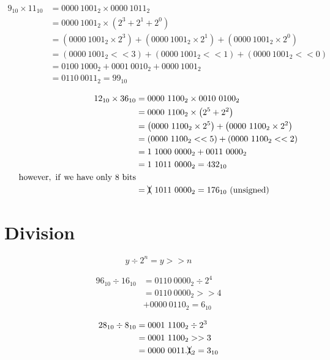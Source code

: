 \documentclass{article}
\begin{document}
\begin{align*}
9_{10} \times 11_{10} &= 0000\ 1001_2 \times 0000\ 1011_2 \\
                      &= 0000\ 1001_2 \times \left( 2^3 + 2^1 + 2^0 \right) \\
                      &= \left( 0000\ 1001_2 \times 2^3 \right) + \left( 0000\ 1001_2 \times 2^1 \right) + \left( 0000\ 1001_2 \times 2^0 \right) \\
                      &= (0000\ 1001_2 << 3) + (0000\ 1001_2 << 1) + (0000\ 1001_2 << 0) \\
                      &= 0100\ 1000_2 + 0001\ 0010_2 + 0000\ 1001_2 \\
                      &= 0110\ 0011_2 = 99_{10}
\end{align*}

\begin{align*}
12_{10} \times 36_{10} &= 0000\ 1100_2 \times 0010\ 0100_2 \\
                       &= 0000\ 1100_2 \times \left( 2^5 + 2^2 \right) \\
                       &= \left( 0000\ 1100_2 \times 2^5 \right) + \left( 0000\ 1100_2 \times 2^2 \right) \\
                       &= (0000\ 1100_2 << 5) + (0000\ 1100_2 << 2) \\
                       &= 1\ 1000\ 0000_2 + 0011\ 0000_2 \\
                       &= 1\ 1011\ 0000_2 = 432_{10} \\
\mathrm{however,\ if\ we\ have\ only\ 8\ bits} & \\
                       &= \xcancel{1}\ 1011\ 0000_2 = 176_{10}\ \mathrm{(unsigned)} \\
\end{align*}


\section{Division}

\[ y \div 2^n = y >> n \]

\begin{align*}
96_{10} \div 16_{10} &= 0110\ 0000_2 \div 2^4 \\
                     &= 0110\ 0000_2 >> 4 \\
                     &+ 0000\ 0110_2 = 6_{10}
\end{align*}

\begin{align*}
28_{10} \div 8_{10} &= 0001\ 1100_2 \div 2^3 \\
                    &= 0001\ 1100_2 >> 3 \\
                    &= 0000\ 0011.\xcancel{1}_2 = 3_{10}
\end{align*}
\end{document}
